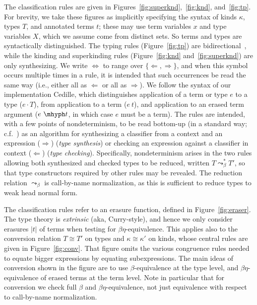 \documentclass{article}
\newcommand{\tpcheck}[0]{\Leftarrow}
\newcommand{\tpsynth}[0]{\Rightarrow}
\begin{document}
The classification rules are given in
Figures~\ref{fig:superknd},~\ref{fig:knd}, and~\ref{fig:tp}.  For
brevity, we take these figures as implicitly specifying the syntax of
kinds $\kappa$, types $T$, and annotated terms $t$; these may use term
variables $x$ and type variables $X$, which we assume come from
distinct sets.  So terms and types are syntactically distinguished.
The typing rules (Figure~\ref{fig:tp}) are
bidirectional~\cite{pierce+00}, while the kinding and superkinding
rules (Figure~\ref{fig:knd} and~\ref{fig:superknd}) are only
synthesizing.  We write $\Leftrightarrow$ to range over
$\{\tpcheck,\tpsynth\}$, and when this symbol occurs multiple times in a rule,
it is intended that such occurrences be read the same way (i.e., either all as
\(\tpcheck\) or all as \(\tpsynth\)).
We follow the syntax of our implementation
Cedille, which distinguishes application of a term or type $e$ to a
type ($e \cdot T$), from application to a term ($e\ t$), and
application to an erased term argument ($e\ \mhyph t$, in which case \(e\) must
be a term).
The rules are intended, with a few points of nondeterminism, to be read
bottom-up (in a standard way;
c.f.~\cite{peytonjones07,Pfe01_Lecture-Notes-on-Bidirectional-Type-Checking}) as
an algorithm for synthesizing a classifier from a context and an expression
($\tpsynth$) (\emph{type synthesis}) or checking an expression against a classifier in context
($\tpcheck$) (\emph{type checking}).
Specifically, nondeterminism arises in the two rules allowing both synthesized
and checked types to be reduced, written \(T \leadsto^*_\beta T'\), so that type
constructors required by other rules may be revealed.
The reduction relation \(\leadsto_\beta\) is call-by-name normalization, as this
is sufficient to reduce types to weak head normal form.

The classification rules refer to an erasure function, defined in
Figure~\ref{fig:eraser}.  The type theory is \emph{extrinsic} (aka,
Curry-style), and hence we only consider erasures $|t|$ of terms when
testing for $\beta\eta$-equivalence.  This applies also to the conversion
relation $T\cong T'$ on types and \(\kappa \cong \kappa'\) on kinds, whose central rules are given in
Figure~\ref{fig:conv}.  That figure omits the various congruence rules
needed to equate bigger expressions by equating subexpressions.  The
main ideas of conversion shown in the figure are to use
$\beta$-equivalence at the type level, and $\beta\eta$-equivalence of
erased terms at the term level.
Note in particular that for conversion we check full \(\beta\) and
\(\beta\eta\)-equivalence, not just equivalence with respect to call-by-name
normalization.
\end{document}
